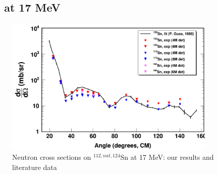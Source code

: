 \subsection{\snTwelveFour\ \el\ at 17 MeV}
\begin{figure}[ht!]
    \centering
        \includegraphics[width = 0.9\textwidth]{figures/neutronECS_Sn_17MeV.png}
        \caption{Neutron \el cross sections on $^{112,nat,124}$Sn at 17
    MeV: our results and literature data} \label{SnECS_17MeV}
\end{figure}

\afterpage{\clearpage}
